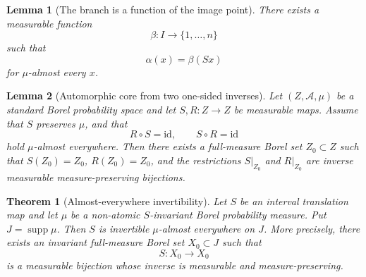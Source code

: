 \documentclass[10pt,a4paper]{amsart}
\newtheorem{lemma}{Lemma}
\newtheorem{theorem}{Theorem}
\DeclareMathOperator{\supp}{supp}
\begin{document}
\begin{lemma}[The branch is a function of the image point]\label{lem:branch-image}
There exists a measurable function
\[
        \beta:I\to\{1,\ldots,n\}
\]
such that
\[
        \alpha(x)=\beta(Sx)
\]
for $\mu$-almost every $x$.
\end{lemma}

\begin{lemma}[Automorphic core from two one-sided inverses]\label{lem:automorphic-core}
Let \((Z,\mathcal A,\mu)\) be a standard Borel probability space and let
\(S,R:Z\to Z\) be measurable maps. Assume that \(S\) preserves \(\mu\), and that
\[
        R\circ S=\mathrm{id},\qquad S\circ R=\mathrm{id}
\]
hold \(\mu\)-almost everywhere. Then there exists a full-measure Borel set
\(Z_0\subset Z\) such that \(S(Z_0)=Z_0\), \(R(Z_0)=Z_0\), and the restrictions
\(S|_{Z_0}\) and \(R|_{Z_0}\) are inverse measurable measure-preserving bijections.
\end{lemma}

\begin{theorem}[Almost-everywhere invertibility]\label{thm:ae-invertible}
Let $S$ be an interval translation map and let $\mu$ be a non-atomic $S$-invariant Borel probability measure. Put $J=\supp\mu$. Then $S$ is invertible $\mu$-almost everywhere on $J$. More precisely, there exists an invariant full-measure Borel set $X_0\subset J$ such that
\[
        S:X_0\to X_0
\]
is a measurable bijection whose inverse is measurable and measure-preserving.
\end{theorem}
\end{document}
